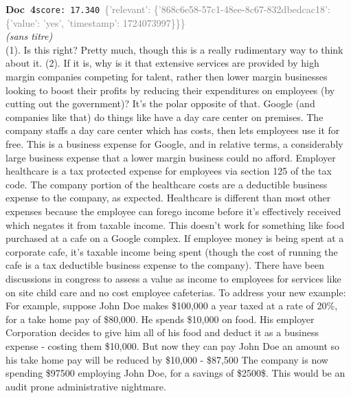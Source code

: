 \documentclass[a4paper,11pt]{article}
\begin{document}
\begin{docenv}
{\footnotesize\textcolor{doccolor}{\textbf{Doc~4}}}\hfill{\tiny\texttt{score:~17.340}}\ {\tiny\textcolor{gray}{\{'relevant': \{'868c6e58-57c1-48ee-8c67-832dbedcac18': \{'value': 'yes', 'timestamp': 1724073997\}\}\}}}\\[3pt]
{\small\textit{(sans titre)}}\\[2pt]
\vspace{2pt}
{\footnotesize 
(1). Is this right? Pretty much, though this is a really rudimentary way to think about it. (2). If it is, why is it that extensive services are provided by high margin companies competing for talent, rather then lower margin businesses looking to boost their profits by reducing their expenditures on employees (by cutting out the government)? It's the polar opposite of that. Google (and companies like that) do things like have a day care center on premises. The company staffs a day care center which has costs, then lets employees use it for free. This is a business expense for Google, and in relative terms, a considerably large business expense that a lower margin business could no afford. Employer healthcare is a tax protected expense for employees via section 125 of the tax code. The company portion of the healthcare costs are a deductible business expense to the company, as expected. Healthcare is different than most other expenses because the employee can forego income before it's effectively received which negates it from taxable income. This doesn't work for something like food purchased at a cafe on a Google complex. If employee money is being spent at a corporate cafe, it's taxable income being spent (though the cost of running the cafe is a tax deductible business expense to the company). There have been discussions in congress to assess a value as income to employees for services like on site child care and no cost employee cafeterias. To address your new example: For example, suppose John Doe makes \$100,000 a year taxed at a rate of 20\%, for a take home pay of \$80,000. He spends \$10,000 on food. His employer Corporation decides to give him all of his food and deduct it as a business expense - costing them \$10,000. But now they can pay John Doe an amount so his take home pay will be reduced by \$10,000 - \$87,500 The company is now spending \$97500 employing John Doe, for a savings of \$2500\$. This would be an audit prone administrative nightmare.}
\end{docenv}
\end{document}
